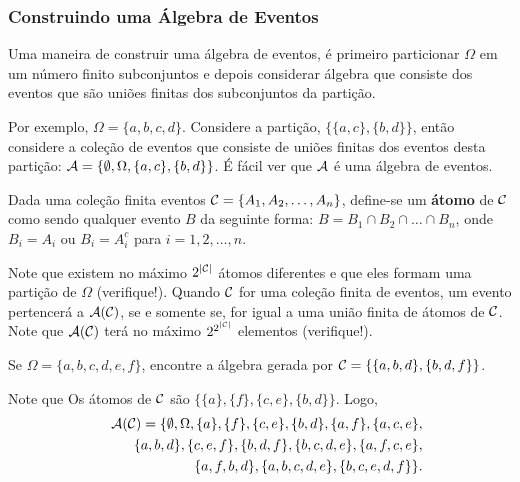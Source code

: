 \begin{frame}
\frametitle{Construindo uma Álgebra de Eventos}


\begin{nota} Uma maneira de construir uma álgebra de eventos, é primeiro
particionar $\Omega$ em um número finito subconjuntos e depois considerar álgebra que consiste
dos eventos que são uniões finitas dos subconjuntos da partição. \end{nota}

\begin{exem}
Por exemplo, $\Omega=\{a,b,c,d\}$. Considere a partição,
$\{\{a,c\},\{b,d\}\}$, então considere a coleção de eventos que consiste de uniões finitas dos eventos desta
partição: ${\cal A}=\{\emptyset, \Omega, \{a,c\},\{b,d\}\}$. É fácil ver
que ${\cal A}$ é uma álgebra de eventos.
\end{exem}

\end{frame}
%
\begin{frame}

\begin{defi}
Dada uma coleção finita eventos ${\cal C}=\{A_1,A_2,\ldots,A_n\}$, define-se um {\bf  átomo} de ${\cal C}$ como sendo qualquer evento
$B$ da seguinte forma: $B=B_1\cap B_2\cap\ldots\cap B_n$, onde $B_i=A_i$ ou $B_i=A_i^c$ para $i=1,2,\ldots,n$.
\end{defi}
Note que existem no máximo $2^{|{\cal C}|}$ átomos diferentes e que eles formam uma partição de $\Omega$ (verifique!). Quando ${\cal C}$ for uma coleção finita de eventos, um evento pertencerá a ${\cal A}({\cal C})$, se e somente se,
for igual a uma união finita de átomos de ${\cal C}$. Note que ${\cal A}({\cal C})$ terá no máximo $2^{2^{|{\cal C}|}}$ elementos (verifique!).

\begin{exem}
Se $\Omega=\{a,b,c,d,e,f\}$, encontre a álgebra gerada por ${\cal C}=\{\{a,b,d\},\{b,d,f\}\}$.

Note que Os átomos de ${\cal C}$ são
$\{\{a\},\{f\},\{c,e\},\{b,d\}\}$. Logo,
\begin{eqnarray}
& & {\cal A}({\cal C})=\{\emptyset,\Omega,\{a\},\{f\},\{c,e\},\{b,d\},\{a,f\},\{a,c,e\},\nonumber \\
& & \{a,b,d\}, \{c,e,f\},\{b,d,f\},\{b,c,d,e\},\{a,f,c,e\},\nonumber \\
& & \{a,f,b,d\},\{a,b,c,d,e\},\{b,c,e,d,f\}\}.\nonumber
\end{eqnarray}
\end{exem}
%
\end{frame}
%
%
%



